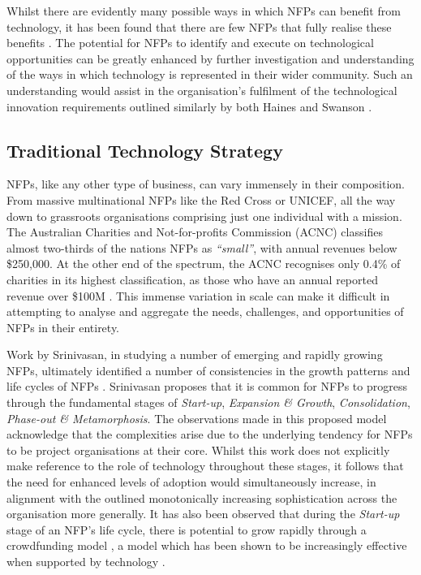 Whilst there are evidently many possible ways in which NFPs can benefit from technology, it has been found that there are few NFPs that fully realise these benefits \cite{infoxchange_2019}. The potential for NFPs to identify and execute on technological opportunities can be greatly enhanced by further investigation and understanding of the ways in which technology is represented in their wider community. Such an understanding would assist in the organisation's fulfilment of the technological innovation requirements outlined similarly by both Haines \cite{haines2003levels} and Swanson \cite{swanson1994information}.

\subsection{Traditional Technology Strategy}

NFPs, like any other type of business, can vary immensely in their composition. From massive multinational NFPs like the Red Cross or UNICEF, all the way down to grassroots organisations comprising just one individual with a mission. The Australian Charities and Not-for-profits Commission (ACNC) classifies almost two-thirds of the nations NFPs as \emph{“small”}, with annual revenues below \$250,000. At the other end of the spectrum, the ACNC recognises only 0.4\% of charities in its highest classification, as those who have an annual reported revenue over \$100M \cite{acnc2020}. This immense variation in scale can make it difficult in attempting to analyse and aggregate the needs, challenges, and opportunities of NFPs in their entirety. 

Work by Srinivasan, in studying a number of emerging and rapidly growing NFPs, ultimately identified a number of consistencies in the growth patterns and life cycles of NFPs \cite{srinivasan2007understanding}. Srinivasan proposes that it is common for NFPs to progress through the fundamental stages of \emph{Start-up}, \emph{Expansion \& Growth}, \emph{Consolidation}, \emph{Phase-out \& Metamorphosis}. The observations made in this proposed model acknowledge that the complexities arise due to the underlying tendency for NFPs to be project organisations at their core. Whilst this work does not explicitly make reference to the role of technology throughout these stages, it follows that the need for enhanced levels of adoption would simultaneously increase, in alignment with the outlined monotonically increasing sophistication across the organisation more generally. It has also been observed that during the \emph{Start-up} stage of an NFP's life cycle, there is potential to grow rapidly through a crowdfunding model \cite{paschen2017choose}, a model which has been shown to be increasingly effective when supported by technology \cite{polishchuk2019technology}.

